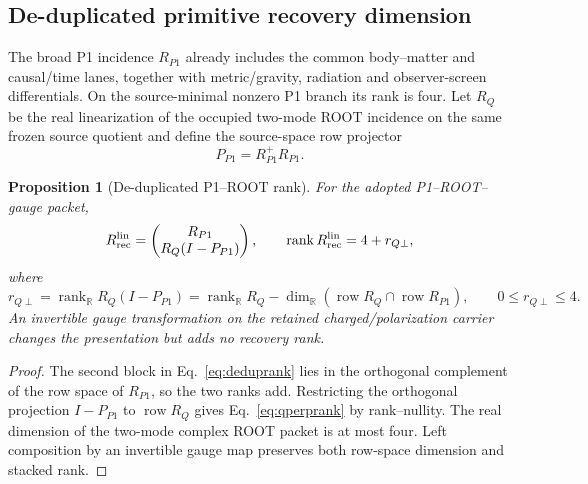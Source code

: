 \documentclass[11pt]{article}
\newtheorem{proposition}{Proposition}
\begin{document}
\subsection{De-duplicated primitive recovery dimension}

The broad P1 incidence $R_{P1}$ already includes the common body--matter and
causal/time lanes, together with metric/gravity, radiation and observer-screen
differentials.
On the source-minimal nonzero P1 branch its rank is four.  Let $R_Q$ be the
real linearization of the occupied two-mode ROOT incidence on the same frozen
source quotient and define the source-space row projector
\begin{equation}
P_{P1}=R_{P1}^{+}R_{P1}.
\label{eq:p1rowprojector}
\end{equation}

\begin{proposition}[De-duplicated P1--ROOT rank]
\label{prop:deduprank}
For the adopted P1--ROOT--gauge packet,
\begin{equation}
R_{\rm rec}^{\rm lin}
=\begin{pmatrix}R_{P1}\\ R_Q(I-P_{P1})\end{pmatrix},
\qquad
\operatorname{rank}R_{\rm rec}^{\rm lin}=4+r_{Q\perp},
\label{eq:deduprank}
\end{equation}
where
\begin{equation}
r_{Q\perp}
=\operatorname{rank}_{\mathbb R}R_Q(I-P_{P1})
=\operatorname{rank}_{\mathbb R}R_Q
-\dim_{\mathbb R}(\operatorname{row}R_Q
\cap\operatorname{row}R_{P1}),
\qquad 0\le r_{Q\perp}\le4.
\label{eq:qperprank}
\end{equation}
An invertible gauge transformation on the retained charged/polarization
carrier changes the presentation but adds no recovery rank.
\end{proposition}

\begin{proof}
The second block in Eq.~\eqref{eq:deduprank} lies in the orthogonal complement
of the row space of $R_{P1}$, so the two ranks add.  Restricting the orthogonal
projection $I-P_{P1}$ to $\operatorname{row}R_Q$ gives
Eq.~\eqref{eq:qperprank} by rank--nullity.  The real dimension of the two-mode
complex ROOT packet is at most four.  Left composition by an invertible gauge
map preserves both row-space dimension and stacked rank.
\end{proof}
\end{document}
